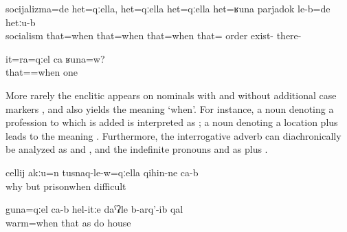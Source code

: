 \begin{exe}
	\ex	\label{ex:‎Socialism was at that time}
	\gll	socijalizma=de	het=qːella, het=qːella het=qːella het=ʁuna parjadok le-b=de hetːu-b\\
		socialism	that=when that=when that=when that= order exist- there-\\
	\glt	{}
		
	\ex	\label{ex:(Is this) that time also one and the same (shirt)?}
		\gll it=ra=qːel	ca	ʁuna=w?\\
			that==when	one	 \\
		\glt {}
\end{exe}

More rarely the enclitic appears on nominals with and without additional case markers , and also yields the meaning `when'. For instance, a noun denoting a profession to which  is added is interpreted as ; a noun denoting a location plus  leads to the meaning  . Furthermore, the interrogative adverb   can diachronically be analyzed as   and , and the indefinite pronouns  and   as   plus . 
%

\begin{exe}

	\ex	\label{ex:‎Because when (you are) in prison it is difficult}
	\gll	cellij	akːu=n	tusnaq-le-w=qːella	qihin-ne	ca-b\\
		why	but	prisonwhen	difficult	\\
	\glt	{}

	\ex	\label{ex:‎When it is warm (i.e. in warm places) the houses are built like this}
	\gll	guna=qːel	ca-b	hel-itːe	daˁʡle	b-arq'-ib	qal\\
		warm=when		that	as	do	house	\\
	\glt	{}
\end{exe} 


